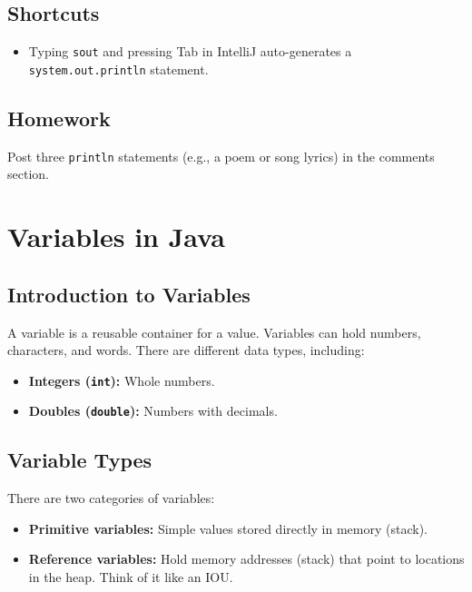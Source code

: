 \documentclass{article}
\begin{document}
\subsection{Shortcuts}

\begin{itemize}
    \item Typing \texttt{sout} and pressing Tab in IntelliJ auto-generates a \texttt{system.out.println} statement.
\end{itemize}

\subsection{Homework}

Post three \texttt{println} statements (e.g., a poem or song lyrics) in the comments section.


\section{Variables in Java}

\subsection{Introduction to Variables}

A variable is a reusable container for a value.  Variables can hold numbers, characters, and words.  There are different data types, including:

\begin{itemize}
    \item \textbf{Integers (\texttt{int}):} Whole numbers.
    \item \textbf{Doubles (\texttt{double}):} Numbers with decimals.
\end{itemize}

\subsection{Variable Types}

There are two categories of variables:

\begin{itemize}
    \item \textbf{Primitive variables:} Simple values stored directly in memory (stack).
    \item \textbf{Reference variables:} Hold memory addresses (stack) that point to locations in the heap.  Think of it like an IOU.
\end{itemize}
\end{document}
